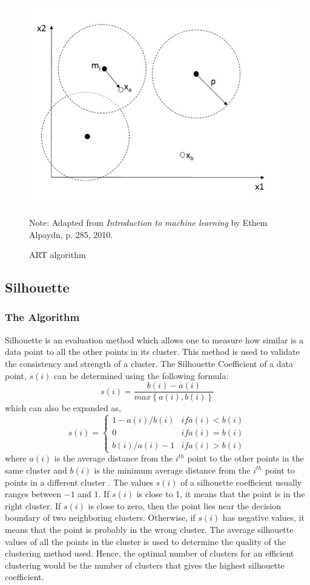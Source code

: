 \documentclass{lmproj}
\begin{document}
\begin{figure}[ht]
	\centering
	\includegraphics[width=0.8\linewidth]{artpic.png}
   \caption[ART]{ART algorithm}
    \footnotesize{Note: Adapted from \textit{Introduction to machine learning} by Ethem Alpaydn, p. 285, 2010. \cite{Clustering}}
 \end{figure}

\subsection{Silhouette}
\subsubsection{The Algorithm}
Silhouette \cite{Rousseeuw} is an evaluation  method which allows one to measure how similar is a data point to all the other points in its cluster. This method is used to validate the consistency and strength of a cluster. The Silhouette Coefficient of a data point, $s(i)$ can be determined using the following formula:
\begin{equation}
s(i) = \frac{b(i) - a(i)}{max\left\{a(i), b(i)\right\}}
\end{equation}
which can also be expanded as,
\begin{equation}
s(i) = \begin{cases}
1-a(i)/b(i) & if a(i)<b(i)
\\0 & if a(i)=b(i)
\\b(i)/a(i) -1 & if a(i)>b(i)
\end{cases}
\end{equation}
where $a(i)$ is the average distance from the $i^{th}$ point to the other points in the same cluster and $b(i)$ is the minimum average distance from the $i^{th}$ point to points in a different cluster \cite{Rousseeuw}. The values $s(i)$ of a silhouette coefficient usually ranges between $-1$ and $1$. If $s(i)$ is close to 1, it means that the point is in the right cluster. If $s(i)$ is close to zero, then the point lies near the decision boundary of two neighboring clusters. Otherwise, if $s(i)$ has negative values, it means that the point is probably in the wrong cluster. The average silhouette values of all the points in the cluster is used to determine the quality of the clustering method used. Hence, the optimal number of clusters for an efficient clustering would be the number of clusters that gives the highest silhouette coefficient.
\end{document}
